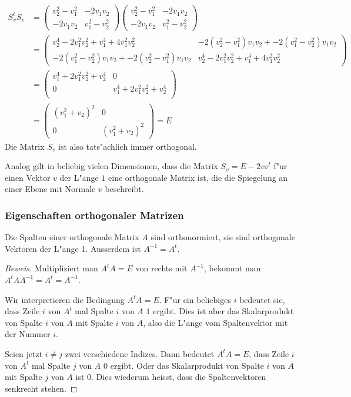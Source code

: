 \begin{align*}
S_v^tS_v
&=
\begin{pmatrix}
v_2^2-v_1^2&-2v_1v_2\\
-2v_1v_2&v_1^2-v_2^2
\end{pmatrix}
\begin{pmatrix}
v_2^2-v_1^2&-2v_1v_2\\
-2v_1v_2&v_1^2-v_2^2
\end{pmatrix}
\\
&=
\begin{pmatrix}
v_2^4-2v_1^2v_2^2+v_1^4+4v_1^2v_2^2&
-2(v_2^2-v_1^2)v_1v_2
+
-2(v_1^2-v_2^2)v_1v_2
\\
-2(v_1^2-v_2^2)v_1v_2
+
-2(v_2^2-v_1^2)v_1v_2
&
v_2^4-2v_1^2v_2^2+v_1^4+4v_1^2v_2^2
\end{pmatrix}
\\
&=
\begin{pmatrix}
v_1^4+2v_1^2v_2^2+v_2^4&0\\
0&v_1^4+2v_1^2v_2^2+v_2^4\\
\end{pmatrix}
\\
&=
\begin{pmatrix}
(v_1^2+v_2)^2&0\\
0&(v_1^2+v_2)^2
\end{pmatrix}=E
\end{align*}
Die Matrix $S_v$ ist also tats"achlich immer orthogonal.

Analog gilt in beliebig vielen Dimensionen, dass die Matrix
$S_v=E-2v v^t$  f"ur einen Vektor $v$ der L"ange $1$ eine orthogonale
Matrix ist, die die Spiegelung an einer Ebene mit Normale $v$
beschreibt.

\subsubsection{Eigenschaften orthogonaler Matrizen}

\begin{satz}
Die Spalten einer orthogonale Matrix $A$ sind orthonormiert, sie sind
orthogonale Vektoren der L"ange 1.
Ausserdem ist $A^{-1}=A^t$.
\end{satz}

\begin{proof}[Beweis]
Multipliziert man $A^tA=E$ von rechts mit $A^{-1}$, bekommt man
$A^tAA^{-1}=A^t=A^{-1}$.

Wir interpretieren die Bedingung $A^tA=E$.
F"ur ein beliebiges $i$
bedeutet sie, dass Zeile $i$ von $A^t$ mal Spalte $i$ von $A$ $1$ ergibt.
Dies ist aber das Skalarprodukt von Spalte $i$ von $A$ mit Spalte $i$
von $A$, also die L"ange vom Spaltenvektor mit der Nummer $i$.

Seien jetzt $i\ne j$ zwei verschiedene Indizes.
Dann bedeutet $A^tA=E$,
dass Zeile $i$ von $A^t$ mal Spalte $j$ von $A$ $0$ ergibt.
Oder das
Skalarprodukt von Spalte $i$ von $A$ mit Spalte $j$ von $A$ ist $0$.
Dies wiederum heisst, dass die Spaltenvektoren senkrecht stehen.
\end{proof}

